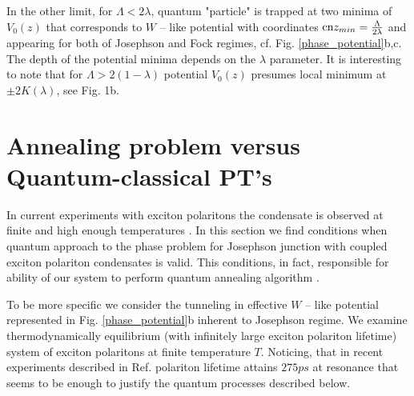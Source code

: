 \documentclass[aps, pre, preprint, groupedaddress, superscriptaddress, showkeys, showpacs] {revtex4-1}
\newcommand{\red}{\color{red}}
\begin{document}
In the other limit, for $\Lambda < 2 \lambda$, quantum "particle" is trapped at two minima of $V_0(z)$ that corresponds to $W$ -- like potential with coordinates $\textrm{cn}{z_{min}} = \frac{\Lambda}{2 \lambda}$ and appearing for both of Josephson and Fock regimes, cf. Fig. \ref{phase_potential}b,c.  
The depth of the potential minima depends on the $\lambda$ parameter.
It is interesting to note that for $\Lambda > 2(1 - \lambda)$ potential $V_0(z)$ presumes local minimum at $\pm 2 K(\lambda)$, see Fig. 1b.

%

%
%
%
%


\section{Annealing problem versus Quantum-classical PT's \label{sec:quantum_classical}}

In current experiments with exciton polaritons  the condensate is observed at finite and high enough temperatures \cite{Sanvitto,Guillet}.
In this section we find conditions when quantum approach to the phase problem for Josephson junction with coupled exciton polariton condensates is valid. This conditions, in fact, responsible for ability of our system to perform quantum annealing algorithm \cite{Das}.

To  be more specific we consider the tunneling in  effective $W$ -- like potential represented in Fig. \ref{phase_potential}b  inherent to  Josephson regime. We examine thermodynamically equilibrium (with infinitely large  exciton polariton lifetime) system of exciton polaritons at finite temperature $T$.  Noticing, that in  recent experiments  described in Ref. \cite{Snoke_2017} polariton lifetime attains  $275ps$ at resonance that seems to be enough to justify the quantum processes described below.
\end{document}
